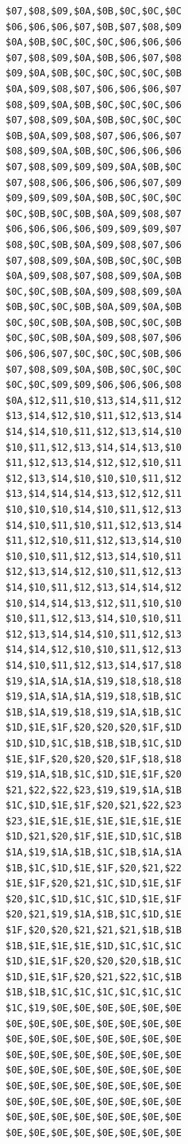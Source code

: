 \hspace{0.1cm}
\begin{minipage}[b]{0.31\linewidth}
\centering
\begin{lstlisting}[basicstyle=\ttfamily\tiny, caption=Y Positions]
$07,$08,$09,$0A,$0B,$0C,$0C,$0C
$06,$06,$06,$07,$0B,$07,$08,$09
$0A,$0B,$0C,$0C,$0C,$06,$06,$06
$07,$08,$09,$0A,$0B,$06,$07,$08
$09,$0A,$0B,$0C,$0C,$0C,$0C,$0B
$0A,$09,$08,$07,$06,$06,$06,$07
$08,$09,$0A,$0B,$0C,$0C,$0C,$06
$07,$08,$09,$0A,$0B,$0C,$0C,$0C
$0B,$0A,$09,$08,$07,$06,$06,$07
$08,$09,$0A,$0B,$0C,$06,$06,$06
$07,$08,$09,$09,$09,$0A,$0B,$0C
$07,$08,$06,$06,$06,$06,$07,$09
$09,$09,$09,$0A,$0B,$0C,$0C,$0C
$0C,$0B,$0C,$0B,$0A,$09,$08,$07
$06,$06,$06,$06,$09,$09,$09,$07
$08,$0C,$0B,$0A,$09,$08,$07,$06
$07,$08,$09,$0A,$0B,$0C,$0C,$0B
$0A,$09,$08,$07,$08,$09,$0A,$0B
$0C,$0C,$0B,$0A,$09,$08,$09,$0A
$0B,$0C,$0C,$0B,$0A,$09,$0A,$0B
$0C,$0C,$0B,$0A,$0B,$0C,$0C,$0B
$0C,$0C,$0B,$0A,$09,$08,$07,$06
$06,$06,$07,$0C,$0C,$0C,$0B,$06
$07,$08,$09,$0A,$0B,$0C,$0C,$0C
$0C,$0C,$09,$09,$06,$06,$06,$08
$0A,$12,$11,$10,$13,$14,$11,$12
$13,$14,$12,$10,$11,$12,$13,$14
$14,$14,$10,$11,$12,$13,$14,$10
$10,$11,$12,$13,$14,$14,$13,$10
$11,$12,$13,$14,$12,$12,$10,$11
$12,$13,$14,$10,$10,$10,$11,$12
$13,$14,$14,$14,$13,$12,$12,$11
$10,$10,$10,$14,$10,$11,$12,$13
$14,$10,$11,$10,$11,$12,$13,$14
$11,$12,$10,$11,$12,$13,$14,$10
$10,$10,$11,$12,$13,$14,$10,$11
$12,$13,$14,$12,$10,$11,$12,$13
$14,$10,$11,$12,$13,$14,$14,$12
$10,$14,$14,$13,$12,$11,$10,$10
$10,$11,$12,$13,$14,$10,$10,$11
$12,$13,$14,$14,$10,$11,$12,$13
$14,$14,$12,$10,$10,$11,$12,$13
$14,$10,$11,$12,$13,$14,$17,$18
$19,$1A,$1A,$1A,$19,$18,$18,$18
$19,$1A,$1A,$1A,$19,$18,$1B,$1C
$1B,$1A,$19,$18,$19,$1A,$1B,$1C
$1D,$1E,$1F,$20,$20,$20,$1F,$1D
$1D,$1D,$1C,$1B,$1B,$1B,$1C,$1D
$1E,$1F,$20,$20,$20,$1F,$18,$18
$19,$1A,$1B,$1C,$1D,$1E,$1F,$20
$21,$22,$22,$23,$19,$19,$1A,$1B
$1C,$1D,$1E,$1F,$20,$21,$22,$23
$23,$1E,$1E,$1E,$1E,$1E,$1E,$1E
$1D,$21,$20,$1F,$1E,$1D,$1C,$1B
$1A,$19,$1A,$1B,$1C,$1B,$1A,$1A
$1B,$1C,$1D,$1E,$1F,$20,$21,$22
$1E,$1F,$20,$21,$1C,$1D,$1E,$1F
$20,$1C,$1D,$1C,$1C,$1D,$1E,$1F
$20,$21,$19,$1A,$1B,$1C,$1D,$1E
$1F,$20,$20,$21,$21,$21,$1B,$1B
$1B,$1E,$1E,$1E,$1D,$1C,$1C,$1C
$1D,$1E,$1F,$20,$20,$20,$1B,$1C
$1D,$1E,$1F,$20,$21,$22,$1C,$1B
$1B,$1B,$1C,$1C,$1C,$1C,$1C,$1C
$1C,$19,$0E,$0E,$0E,$0E,$0E,$0E
$0E,$0E,$0E,$0E,$0E,$0E,$0E,$0E
$0E,$0E,$0E,$0E,$0E,$0E,$0E,$0E
$0E,$0E,$0E,$0E,$0E,$0E,$0E,$0E
$0E,$0E,$0E,$0E,$0E,$0E,$0E,$0E
$0E,$0E,$0E,$0E,$0E,$0E,$0E,$0E
$0E,$0E,$0E,$0E,$0E,$0E,$0E,$0E
$0E,$0E,$0E,$0E,$0E,$0E,$0E,$0E
$0E,$0E,$0E,$0E,$0E,$0E,$0E,$0E
\end{lstlisting}
\end{minipage}
